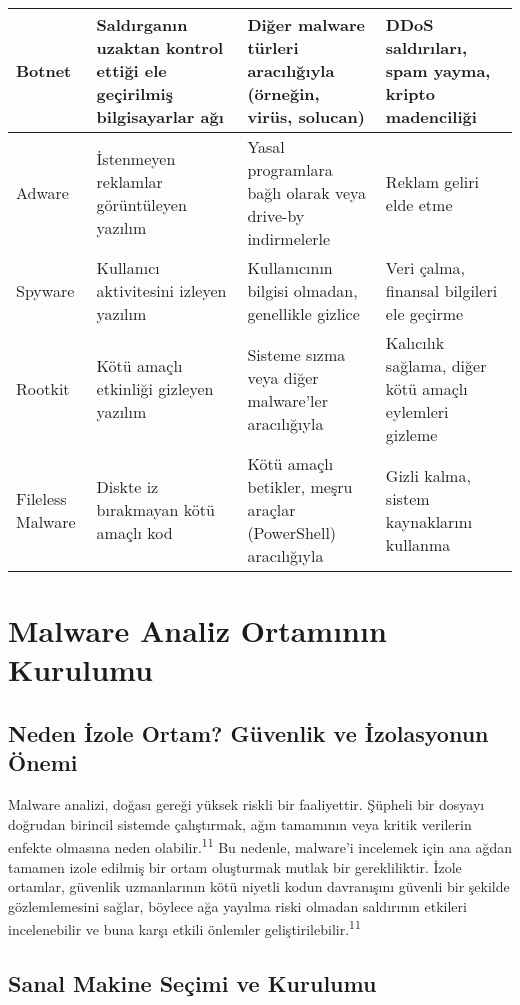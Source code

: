 \begin{longtable}{|p{2.5cm}|p{3cm}|p{3.5cm}|p{3.5cm}|}
\hline
Botnet & Saldırganın uzaktan kontrol ettiği ele geçirilmiş bilgisayarlar ağı & Diğer malware türleri aracılığıyla (örneğin, virüs, solucan) & DDoS saldırıları, spam yayma, kripto madenciliği \\
\hline
Adware & İstenmeyen reklamlar görüntüleyen yazılım & Yasal programlara bağlı olarak veya drive-by indirmelerle & Reklam geliri elde etme \\
\hline
Spyware & Kullanıcı aktivitesini izleyen yazılım & Kullanıcının bilgisi olmadan, genellikle gizlice & Veri çalma, finansal bilgileri ele geçirme \\
\hline
Rootkit & Kötü amaçlı etkinliği gizleyen yazılım & Sisteme sızma veya diğer malware'ler aracılığıyla & Kalıcılık sağlama, diğer kötü amaçlı eylemleri gizleme \\
\hline
Fileless Malware & Diskte iz bırakmayan kötü amaçlı kod & Kötü amaçlı betikler, meşru araçlar (PowerShell) aracılığıyla & Gizli kalma, sistem kaynaklarını kullanma \\
\hline
\end{longtable}

\section{Malware Analiz Ortamının Kurulumu}

\subsection{Neden İzole Ortam? Güvenlik ve İzolasyonun Önemi}

Malware analizi, doğası gereği yüksek riskli bir faaliyettir. Şüpheli bir dosyayı doğrudan birincil sistemde çalıştırmak, ağın tamamının veya kritik verilerin enfekte olmasına neden olabilir.\textsuperscript{11} Bu nedenle, malware'i incelemek için ana ağdan tamamen izole edilmiş bir ortam oluşturmak mutlak bir gerekliliktir. İzole ortamlar, güvenlik uzmanlarının kötü niyetli kodun davranışını güvenli bir şekilde gözlemlemesini sağlar, böylece ağa yayılma riski olmadan saldırının etkileri incelenebilir ve buna karşı etkili önlemler geliştirilebilir.\textsuperscript{11}

\subsection{Sanal Makine Seçimi ve Kurulumu}

